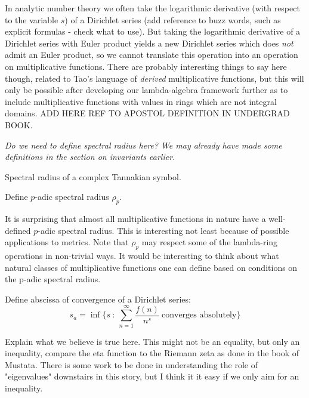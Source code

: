 \documentclass[a4paper]{article}
\begin{document}

\begin{remark}
In analytic number theory we often take the logarithmic derivative (with respect to the variable $s$) of a Dirichlet series (add reference to buzz words, such as explicit formulas - check what to use). But taking the logarithmic derivative of a Dirichlet series with Euler product yields a new Dirichlet series which does \emph{not} admit an Euler product, so we cannot translate this operation into an operation on multiplicative functions. There are probably interesting things to say here though, related to Tao's language of \emph{derived} multiplicative functions, but this will only be possible after developing our lambda-algebra framework further as to include multiplicative functions with values in rings which are not integral domains. ADD HERE REF TO APOSTOL DEFINITION IN UNDERGRAD BOOK.
\end{remark}

\emph{Do we need to define spectral radius here? We may already have made some definitions in the section on invariants earlier.}

\begin{definition}
Spectral radius of a complex Tannakian symbol.
\end{definition}

\begin{definition}
Define $p$-adic spectral radius $\rho_p$.
\end{definition}

\begin{remark}
It is surprising that almost all multiplicative functions in nature have a well-defined $p$-adic spectral radius. This is interesting not least because of possible applications to metrics. Note that $\rho_p$ may respect some of the lambda-ring operations in non-trivial ways. It would be interesting to think about what natural classes of multiplicative functions one can define based on conditions on the p-adic spectral radius.
\end{remark}

\begin{definition}
Define abscissa of convergence of a Dirichlet series:
$$   s_a = \inf \{ s \ : \ \sum_{n=1}^{\infty} \frac{f(n)}{n^s} \ \textrm{converges absolutely}  \}  $$
\end{definition}

Explain what we believe is true here. This might not be an equality, but only an inequality, compare the eta function to the Riemann zeta as done in the book of Mustata. There is some work to be done in understanding the role of "eigenvalues" downstairs in this story, but I think it it easy if we only aim for an inequality.
\end{document}
